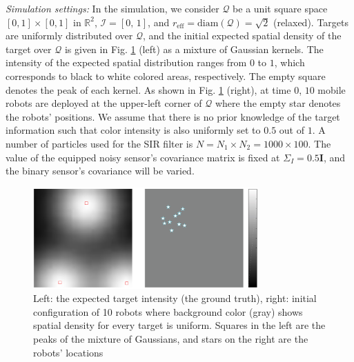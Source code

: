 \documentclass[journal]{IEEEtran}
\begin{document}
\textit{Simulation settings:}
In the simulation, we consider  $\mathcal{Q}$ be a unit square space $[0,1]\times [0,1]$ in $\mathbb{R}^2$, $\mathcal{I} = [0,\,1]$, and $r_{\text{eff}} = \text{diam}(\mathcal{Q})=\sqrt{2}$ (relaxed). 
Targets are uniformly distributed over $\mathcal{Q}$, and the initial expected spatial density of the target over $\mathcal{Q}$ is given in Fig. \ref{fig:fig1} (left) as a mixture of Gaussian kernels. The intensity of the expected spatial distribution ranges from $0$ to $1$, which corresponds to black to white colored areas, respectively. The empty square denotes the peak of each kernel.
As shown in Fig. \ref{fig:fig1} (right), at time $0$, $10$ mobile robots are deployed at the upper-left corner of $\mathcal{Q}$ where the empty star denotes the robots' positions. We assume that there is no prior knowledge of the target information such that color intensity is also uniformly set to $0.5$ out of $1$.
A number of particles used for the SIR filter is $N= N_1\times N_2 = 1000 \times 100$. The value of the equipped noisy sensor's covariance matrix is fixed at $\Sigma_I = 0.5\mathbf{I}$, and the binary sensor's covariance will be varied.
\begin{figure}
	\centering
	\includegraphics[width=3.4in]{figure/init_10_deploy_pdf}
	\caption{Left: the expected target intensity (the ground truth), right: initial configuration of 10 robots where background color (gray) shows spatial density for every target is uniform. Squares in the left are the peaks of the mixture of Gaussians, and stars on the right are the robots' locations} 
	\label{fig:fig1}
\end{figure}
\end{document}
